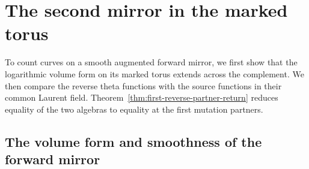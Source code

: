 \documentclass[11pt,reqno]{amsart}
\numberwithin{equation}{section}
\theoremstyle{definition}
\theoremstyle{remark}
\begin{document}
\section{The second mirror in the marked torus}
\label{sec:second-mirror}

To count curves on a smooth augmented forward mirror, we first show that
the logarithmic volume form on its marked torus extends across the
complement. We then compare the reverse theta functions with the source
functions in their common Laurent field.
Theorem~\ref{thm:first-reverse-partner-return} reduces equality of the
two algebras to equality at the first mutation partners.

\subsection{The volume form and smoothness of the forward mirror}
\label{subsec:reverse-projective-traces}
\end{document}
